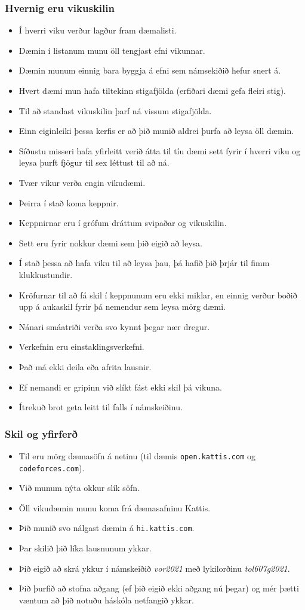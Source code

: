 \documentclass[handout]{beamer}
\newcommand\env[2]
{
	\begin{#1}
	#2
	\end{#1}
}
\begin{document}
\env{frame}
{
	\frametitle{Hvernig eru vikuskilin}
	\env{itemize}
	{
		\item<1-> Í hverri viku verður lagður fram dæmalisti.
		\item<2-> Dæmin í listanum munu öll tengjast efni vikunnar.
		\item<3-> Dæmin munum einnig bara byggja á efni sem námsekiðið hefur snert á.
		\item<4-> Hvert dæmi mun hafa tiltekinn stigafjölda (erfiðari dæmi gefa fleiri stig).
		\item<5-> Til að standast vikuskilin þarf ná vissum stigafjölda.
		\item<6-> Einn eiginleiki þessa kerfis er að þið munið aldrei þurfa að leysa öll dæmin.
		\item<7-> Síðustu misseri hafa yfirleitt verið átta til tíu dæmi sett fyrir í hverri viku og leysa þurft fjögur til sex léttust til að ná.
	}
}

\env{frame}
{
	\env{itemize}
	{
		\item<1-> Tvær vikur verða engin vikudæmi.
		\item<2-> Þeirra í stað koma keppnir.
		\item<3-> Keppnirnar eru í grófum dráttum svipaðar og vikuskilin.
		\item<4-> Sett eru fyrir nokkur dæmi sem þið eigið að leysa.
		\item<5-> Í stað þessa að hafa viku til að leysa þau, þá hafið þið þrjár til fimm klukkustundir.
		\item<6-> Kröfurnar til að fá skil í keppnunum eru ekki miklar, en einnig verður boðið upp á aukaskil fyrir þá nemendur sem leysa mörg dæmi.
		\item<7-> Nánari smáatriði verða svo kynnt þegar nær dregur.
	}
}

\env{frame}
{
	\env{itemize}
	{
		\item<1-> Verkefnin eru einstaklingsverkefni.
		\item<2-> Það má ekki deila eða afrita lausnir.
		\item<3-> Ef nemandi er gripinn við slíkt fást ekki skil þá vikuna.
		\item<4-> Ítrekuð brot geta leitt til falls í námskeiðinu.
	}
}

\env{frame}
{
	\frametitle{Skil og yfirferð}
	\env{itemize}
	{
		\item<1-> Til eru mörg dæmasöfn á netinu (til dæmis \texttt{open.kattis.com} og \texttt{codeforces.com}).
		\item<2-> Við munum nýta okkur slík söfn.
		\item<3-> Öll vikudæmin munu koma frá dæmasafninu Kattis.
		\item<4-> Þið munið svo nálgast dæmin á \texttt{hi.kattis.com}.
		\item<5-> Þar skilið þið líka lausnunum ykkar.
		\item<6-> Þið eigið að skrá ykkur í námskeiðið \emph{vor2021} með lykilorðinu \emph{tol607g2021}.
		\item<7-> Þið þurfið að stofna aðgang (ef þið eigið ekki aðgang nú þegar) og mér þætti væntum að þið notuðu háskóla netfangið ykkar.
	}
}
\end{document}
